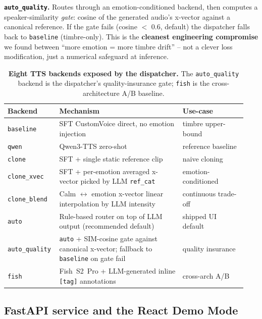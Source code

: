 \documentclass[10pt,a4paper]{article}
\begin{document}
\textbf{\texttt{auto\_quality}.} Routes through an emotion-conditioned
backend, then computes a speaker-similarity \emph{gate}: cosine of the
generated audio's x-vector against a canonical reference. If the gate fails
(cosine $<$ 0.6, default) the dispatcher falls back to \texttt{baseline}
(timbre-only). This is the \textbf{cleanest engineering compromise} we found
between ``more emotion = more timbre drift'' -- not a clever loss
modification, just a numerical safeguard at inference.

\begin{table}[t]
\centering\small
\caption{\textbf{Eight TTS backends exposed by the dispatcher.} The
\texttt{auto\_quality} backend is the dispatcher's quality-insurance gate;
\texttt{fish} is the cross-architecture A/B baseline.}
\label{tab:backends}
\footnotesize
\begin{tabular}{@{}p{0.18\linewidth}p{0.50\linewidth}p{0.26\linewidth}@{}}
\toprule
\textbf{Backend} & \textbf{Mechanism} & \textbf{Use-case} \\
\midrule
\texttt{baseline}     & SFT CustomVoice direct, no emotion injection                             & timbre upper-bound \\
\texttt{qwen}         & Qwen3-TTS zero-shot                                                      & reference baseline \\
\texttt{clone}        & SFT + single static reference clip                                       & naive cloning \\
\texttt{clone\_xvec}  & SFT + per-emotion averaged x-vector picked by LLM \texttt{ref\_cat}      & emotion-conditioned \\
\texttt{clone\_blend} & Calm $\leftrightarrow$ emotion x-vector linear interpolation by LLM intensity & continuous trade-off \\
\texttt{auto}         & Rule-based router on top of LLM output (recommended default)             & shipped UI default \\
\rowcolor{success!7}
\texttt{auto\_quality} & \texttt{auto} + SIM-cosine gate against canonical x-vector; fallback to \texttt{baseline} on gate fail & quality insurance \\
\texttt{fish}         & Fish~S2~Pro + LLM-generated inline \texttt{[tag]} annotations            & cross-arch A/B \\
\bottomrule
\end{tabular}
\end{table}

\subsection{FastAPI service and the React Demo Mode}
\end{document}
